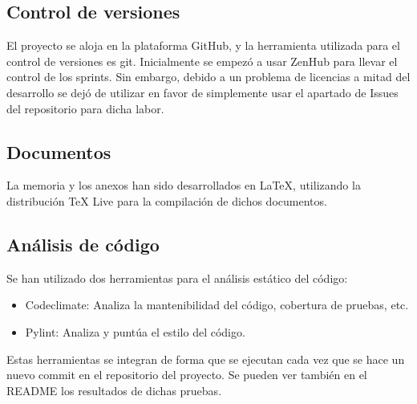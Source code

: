 \subsection{Control de versiones}

El proyecto se aloja en la plataforma GitHub, y la herramienta utilizada para el control de versiones es git.
Inicialmente se empezó a usar ZenHub para llevar el control de los sprints. Sin embargo, debido a un problema de 
licencias a mitad del desarrollo se dejó de utilizar en favor de simplemente usar el apartado de Issues del repositorio 
para dicha labor.

\subsection{Documentos}

La memoria y los anexos han sido desarrollados en LaTeX, utilizando la distribución TeX Live\cite{texlive} para la
compilación de dichos documentos.

\subsection{Análisis de código}

Se han utilizado dos herramientas para el análisis estático del código:
\begin{itemize}
    \item Codeclimate: Analiza la mantenibilidad del código, cobertura de pruebas, etc.
    \item Pylint: Analiza y puntúa el estilo del código.
\end{itemize}

Estas herramientas se integran de forma que se ejecutan cada vez que se hace un nuevo commit en el repositorio del proyecto.
Se pueden ver también en el README los resultados de dichas pruebas.